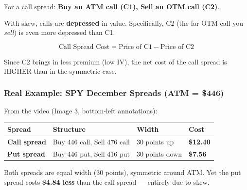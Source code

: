 \documentclass[12pt,openany]{book}
\begin{document}
For a call spread: \textbf{Buy an ATM call (C1), Sell an OTM call (C2)}.

With skew, calls are \textbf{depressed} in value. Specifically, C2 (the far OTM call you \emph{sell}) is even more depressed than C1.

\[
\text{Call Spread Cost} = \text{Price of C1} - \text{Price of C2}
\]

Since C2 brings in less premium (low IV), the net cost of the call spread is HIGHER than in the symmetric case.


\begin{center}
\end{center}


\subsubsection{Real Example: SPY December Spreads (ATM = \$446)}

From the video (Image 3, bottom-left annotations):

\begin{center}
\scriptsize
\setlength{\tabcolsep}{3pt}
\begin{tabular}{|L{3.0cm}|L{3.0cm}|L{3.0cm}|L{3.0cm}|}
\hline
\textbf{Spread} & \textbf{Structure} & \textbf{Width} & \textbf{Cost} \\
\hline
\textbf{Call spread} & Buy 446 call, Sell 476 call & 30 points up & \textbf{\$12.40} \\
\hline
\textbf{Put spread} & Buy 446 put, Sell 416 put & 30 points down & \textbf{\$7.56} \\
\hline
\end{tabular}
\end{center}

Both spreads are equal width (30 points), symmetric around ATM. Yet the put spread costs \textbf{\$4.84 less} than the call spread — entirely due to skew.
\end{document}
